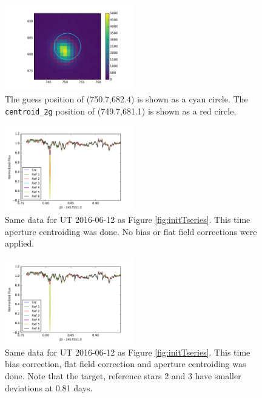 \documentclass[twocolumn]{aastex61}
\begin{document}
\begin{figure}
\begin{centering}
\includegraphics[width=0.5\textwidth]{centering.pdf}
\caption{The guess position of (750.7,682.4) is shown as a cyan circle. The \texttt{centroid\_2g} position of (749.7,681.1) is shown as a red circle.}\label{fig:centroid2g}
\end{centering}
\end{figure}

\begin{figure}
\begin{centering}
\includegraphics[width=0.5\textwidth]{second_t_series.pdf}
\caption{Same data for UT 2016-06-12 as Figure \ref{fig:initTseries}.
This time aperture centroiding was done.
No bias or flat field corrections were applied.}\label{fig:secTseries}
\end{centering}
\end{figure}

\begin{figure}
\begin{centering}
\includegraphics[width=0.5\textwidth]{second_t_series_bias_flat.pdf}
\caption{Same data for UT 2016-06-12 as Figure \ref{fig:initTseries}.
This time bias correction, flat field correction and aperture centroiding was done.
Note that the target, reference stars 2 and 3 have smaller deviations at 0.81 days.}\label{fig:secTseriesBiasFlat}
\end{centering}
\end{figure}
\end{document}
